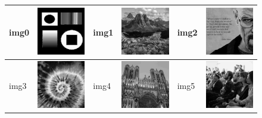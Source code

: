 \documentclass{article}
\begin{document}
\begin{figure}[!htp]
\begin{center}
\begin{tabular}[t]{|ll|ll|ll|}
\hline
img0 & \includegraphics[width=3cm]{../imgs/output/gray_8_50_2000/img00.png} &
img1 & \includegraphics[width=3cm]{../imgs/output/gray_8_50_2000/img01.png} &
img2 & \includegraphics[width=3cm]{../imgs/output/gray_8_50_2000/img02.png} \\
\hline
img3 & \includegraphics[width=3cm]{../imgs/output/gray_8_50_2000/img03.png} &
img4 & \includegraphics[width=3cm]{../imgs/output/gray_8_50_2000/img04.png} &
img5 & \includegraphics[width=3cm]{../imgs/output/gray_8_50_2000/img05.png} \\

\end{tabular}
\end{center}
\end{figure}
\end{document}
